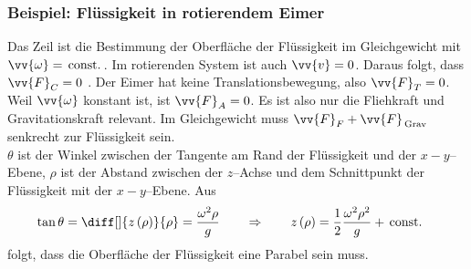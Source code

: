 \documentclass[a4paper,12pt]{article}
\numberwithin{equation}{section}
\begin{document}
\subsubsection{Beispiel: Flüssigkeit in rotierendem Eimer}
Das Zeil ist die Bestimmung der Oberfläche der Flüssigkeit im Gleichgewicht mit $\vv{\omega }=\,\text{const.}\,$. Im rotierenden System ist auch $\vv{v}=0$. Daraus folgt, dass $\vv{F}_C=0$ . Der Eimer hat keine Translationsbewegung, also $\vv{F}_T=0$. Weil $\vv{\omega }$ konstant ist, ist $\vv{F}_A=0$. Es ist also nur die Fliehkraft und Gravitationskraft relevant. Im Gleichgewicht muss $\vv{F}_F+\vv{F}_{\,\text{Grav}\,}$ senkrecht zur Flüssigkeit sein.\\\indent
$\theta $ ist der Winkel zwischen der Tangente am Rand der Flüssigkeit und der $x-y$--Ebene, $\rho $ ist der Abstand zwischen der $z$--Achse und dem Schnittpunkt der Flüssigkeit mit der $x-y$--Ebene. Aus
\begin{align*}
        \tan \theta &=\diff[]{z\left(\rho \right)}{\rho }=\dfrac{\omega ^2\rho }{g}\qquad \Rightarrow \qquad z\left(\rho \right)=\dfrac{1}{2}\dfrac{\omega ^2\rho ^2}{g}+\,\text{const.}\,
\end{align*}
folgt, dass die Oberfläche der Flüssigkeit eine Parabel sein muss.
\end{document}
